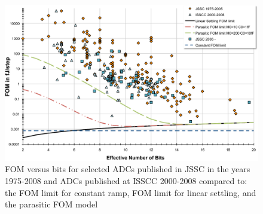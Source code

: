 \begin{figure}[htb]
\centering 
 \includegraphics[width=\myfigwidthl]{graphics/adcfom}
  \caption{FOM versus bits for selected ADCs published in JSSC in the
  years 1975-2008 and ADCs published at ISSCC 2000-2008 compared to:
  the FOM limit for constant ramp, FOM limit for linear settling, and the parasitic FOM model}
  \label{fig:fomadcs}
\end{figure}



